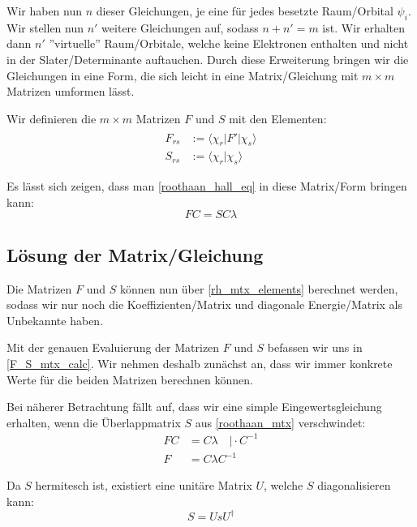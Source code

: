 Wir haben nun $n$ dieser Gleichungen, je eine für jedes besetzte Raum\-/Orbital $\psi_i$.
Wir stellen nun $n'$ weitere Gleichungen auf, sodass $n + n' = m$ ist.
Wir erhalten dann $n'$ ''virtuelle'' Raum\-/Orbitale, welche keine Elektronen enthalten und
nicht in der Slater\-/Determinante auftauchen.
Durch diese Erweiterung bringen wir die Gleichungen in eine Form,
die sich leicht in eine Matrix\-/Gleichung mit $m\times m$ Matrizen umformen lässt.

Wir definieren die $m\times m$ Matrizen $F$ und $S$ mit den Elementen:
\begin{equation}\label{rh_mtx_elements}
  \begin{aligned}
    F_{r s} &:= \langle \chi_r \vert \hat{F}' \vert \chi_s \rangle\\
    S_{r s} &:= \langle \chi_r \vert \chi_s \rangle
  \end{aligned}
\end{equation}

Es lässt sich zeigen, dass man \cref*{roothaan_hall_eq} in diese Matrix\-/Form bringen kann:
\begin{equation} \label{roothaan_mtx}
  FC = SC\lambda
\end{equation}

\cite[5.2.3.6.1]{lewars_2016}

\subsection{Lösung der Matrix\-/Gleichung}
Die Matrizen $F$ und $S$ können nun über \cref{rh_mtx_elements} berechnet werden,
sodass wir nur noch die Koeffizienten\-/Matrix und diagonale Energie\-/Matrix als Unbekannte haben.

Mit der genauen Evaluierung der Matrizen $F$ und 
$S$ befassen wir uns in \cref{F_S_mtx_calc}.
Wir nehmen deshalb zunächst an,
dass wir immer konkrete Werte für die beiden Matrizen berechnen können.

Bei näherer Betrachtung fällt auf, dass wir eine simple Eingewertsgleichung erhalten,
wenn die Überlappmatrix $S$ aus \cref{roothaan_mtx} verschwindet:
\begin{align*}
    FC &= C\lambda \quad \vert \cdot C^{-1}\\
    F &= C\lambda C^{-1}
\end{align*}

Da $S$ hermitesch ist, existiert eine unitäre Matrix $U$, welche $S$ diagonalisieren kann:
\begin{equation}
    S = U s U^\dagger
\end{equation}

